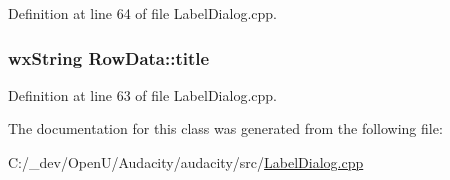 Definition at line 64 of file Label\+Dialog.\+cpp.

\subsubsection[{\texorpdfstring{title}{title}}]{\setlength{\rightskip}{0pt plus 5cm}wx\+String Row\+Data\+::title}\hypertarget{class_row_data_ac0d1baa574a87217b87f57e1521e357b}{}\label{class_row_data_ac0d1baa574a87217b87f57e1521e357b}


Definition at line 63 of file Label\+Dialog.\+cpp.



The documentation for this class was generated from the following file\+:\begin{DoxyCompactItemize}
\item 
C\+:/\+\_\+dev/\+Open\+U/\+Audacity/audacity/src/\hyperlink{_label_dialog_8cpp}{Label\+Dialog.\+cpp}\end{DoxyCompactItemize}
